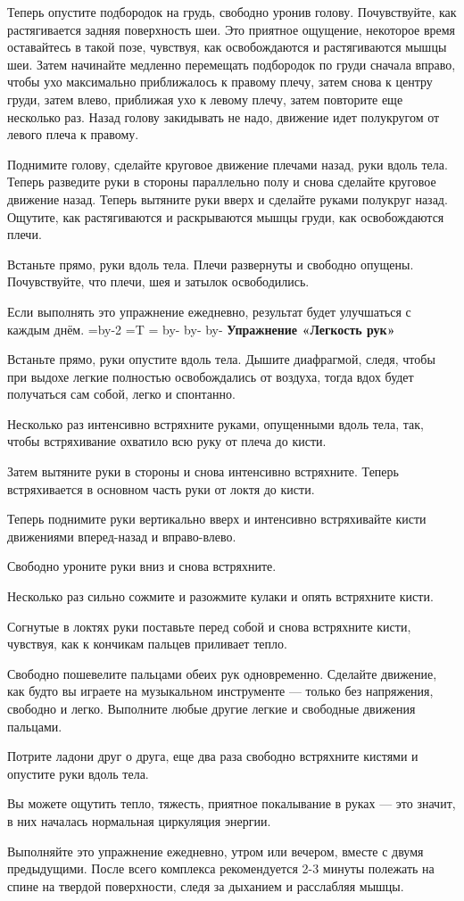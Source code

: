 Теперь опустите подбородок на грудь, свободно уронив голову. Почувствуйте, как растягивается задняя поверхность шеи. Это приятное ощущение, некоторое время оставайтесь в такой позе, чувствуя, как освобождаются и растягиваются мышцы шеи. Затем начинайте медленно перемещать подбородок по груди сначала вправо, чтобы ухо максимально приближалось к правому плечу, затем снова к центру груди, затем влево, приближая ухо к левому плечу, затем повторите еще несколько раз. Назад голову закидывать не надо, движение идет полукругом от левого плеча к правому.

Поднимите голову, сделайте круговое движение плечами назад, руки вдоль тела. Теперь разведите руки в стороны параллельно полу и снова сделайте круговое движение назад. Теперь вытяните руки вверх и сделайте руками полукруг назад. Ощутите, как растягиваются и раскрываются мышцы груди, как освобождаются плечи.

Встаньте прямо, руки вдоль тела. Плечи развернуты и свободно опущены. Почувствуйте, что плечи, шея и затылок освободились.

Если выполнять это упражнение ежедневно, результат будет улучшаться с каждым днём.
\bye
\pdfhorigin=13mm \hsize=\pdfpagewidth \advance\hsize by-2\pdfhorigin
\pdfvorigin=15mm =\hbox{T} =\topskip \advance{} by-
  \advance\pdfvorigin by-
\vsize=282mm \advance\vsize by-\pdfvorigin
\nopagenumbers
{\bf Упражнение «Легкость рук»}

Встаньте прямо, руки опустите вдоль тела. Дышите диафрагмой, следя, чтобы при выдохе легкие полностью освобождались от воздуха, тогда вдох будет получаться сам собой, легко и спонтанно.

Несколько раз интенсивно встряхните руками, опущенными вдоль тела, так, чтобы встряхивание охватило всю руку от плеча до кисти.

Затем вытяните руки в стороны и снова интенсивно встряхните. Теперь встряхивается в основном часть руки от локтя до кисти.

Теперь поднимите руки вертикально вверх и интенсивно встряхивайте кисти движениями вперед-назад и вправо-влево.

Свободно уроните руки вниз и снова встряхните.

Несколько раз сильно сожмите и разожмите кулаки и опять встряхните кисти.

Согнутые в локтях руки поставьте перед собой и снова встряхните кисти, чувствуя, как к кончикам пальцев приливает тепло.

Свободно пошевелите пальцами обеих рук одновременно. Сделайте движение, как будто вы играете на
музыкальном инструменте --- только без напряжения, свободно и легко. Выполните любые другие легкие и свободные движения пальцами.

Потрите ладони друг о друга, еще два раза свободно встряхните кистями и опустите руки вдоль тела.

Вы можете ощутить тепло, тяжесть, приятное покалывание в руках --- это значит, в них началась
нормальная циркуляция энергии.

Выполняйте это упражнение ежедневно, утром или вечером, вместе с двумя предыдущими. После всего комплекса рекомендуется 2-3 минуты полежать на спине на твердой поверхности, следя за дыханием и расслабляя мышцы.
\bye
